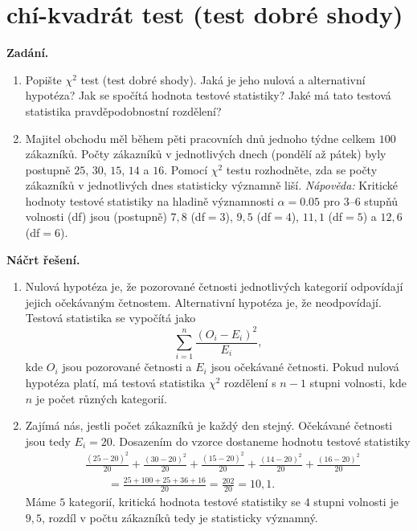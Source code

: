\section{chí-kvadrát test (test dobré shody)}

\noindent\textbf{Zadání.}\par
\begin{enumerate}
  \item Popište $\chi^2$ test (test dobré shody). Jaká je jeho nulová a alternativní hypotéza?
    Jak se spočítá hodnota testové statistiky? Jaké má tato testová statistika pravděpodobnostní rozdělení?
  \item Majitel obchodu měl během pěti pracovních dnů jednoho týdne celkem $100$ zákazníků.
    Počty zákazníků v jednotlivých dnech (pondělí až pátek) byly postupně $25$, $30$, $15$, $14$ a $16$.
    Pomocí $\chi^2$ testu rozhodněte, zda se počty zákazníků v jednotlivých dnes statisticky významně liší.
    \textit{Nápověda:} Kritické hodnoty testové statistiky na hladině významnosti $\alpha = 0.05$ pro
    3--6 stupňů volnosti (df) jsou (postupně) $7{,}8$ (df${}=3$), $9{,}5$ (df${}=4$), $11{,}1$ (df${}=5$)
    a $12{,}6$ (df${}=6$).
\end{enumerate}

\medskip
\noindent\textbf{Náčrt řešení.}\par
\begin{enumerate}
  \item Nulová hypotéza je, že pozorované četnosti jednotlivých kategorií odpovídají jejich očekávaným
    četnostem. Alternativní hypotéza je, že neodpovídají. Testová statistika se vypočítá jako
    \[
      \sum_{i=1}^{n} \frac{(O_i - E_i)^2}{E_i},
    \]
    kde $O_i$ jsou pozorované četnosti a $E_i$ jsou očekávané četnosti. Pokud nulová hypotéza platí,
    má testová statistika $\chi^2$ rozdělení s $n-1$ stupni volnosti, kde $n$ je počet různých kategorií.
  \item Zajímá nás, jestli počet zákazníků je každý den stejný. Očekávané četnosti jsou tedy $E_i = 20$.
    Dosazením do vzorce dostaneme hodnotu testové statistiky
    \[
      \begin{aligned}
      &\frac{(25-20)^2}{20} + \frac{(30-20)^2}{20} + \frac{(15-20)^2}{20} + \frac{(14-20)^2}{20} + \frac{(16-20)^2}{20}\\
      &\qquad= \frac{25 + 100 + 25 + 36 + 16}{20} = \frac{202}{20} = 10{,}1.
      \end{aligned}
    \]
    Máme $5$ kategorií, kritická hodnota testové statistiky se $4$ stupni volnosti je $9{,}5$, rozdíl
    v počtu zákazníků tedy je statisticky významný.
\end{enumerate}

